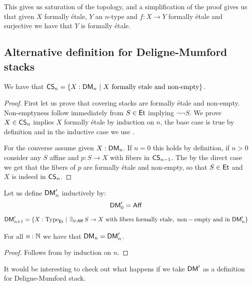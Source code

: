 \begin{remark}
This gives us saturation of the topology, and a simplification of the proof gives us that given $X$ formally \'etale, $Y$ an $n$-type and $f:X\to Y$ formally \'etale and surjective we have that $Y$ is formally \'etale.
\end{remark}


\subsection{Alternative definition for Deligne-Mumford stacks}

\begin{proposition}\label{covering-stacks-are-formally-etale}
We have that $\CS_n = \{X:\DM_n\ |\ X\ \text{formally\ etale\ and\ non-empty}\}$.
\end{proposition}

\begin{proof}
First let us prove that covering stacks are formally \'etale and non-empty. Non-emptyness follow immediately from $S\in\mathsf{Et}$ implying $\neg\neg S$. We prove $X\in\mathsf{CS}_n$ implies $X$ formally \'etale by induction on $n$, the base case is true by definition and in the inductive case we use .

For the converse assume given $X:\mathsf{DM}_n$. If $n=0$ this holds by definition, if $n>0$ consider any $S$ affine and $p:S\to X$ with fibers in $\mathsf{CS}_{n-1}$. The by the direct case we get that the fibers of $p$ are formally \'etale and non-empty, so that $S\in\mathsf{Et}$ and $X$ is indeed in $\mathsf{CS}_n$.
\end{proof}

\begin{definition}
Let us define $\mathsf{DM}'_n$ inductively by: 
\[\mathsf{DM}'_0 = \mathsf{Aff}\]
\[\DM'_{n+1} = \{X:\Type_\Et\ |\ \exists_{S:\Aff}\, S\to X\ \mathrm{with\ fibers\ formally\ etale,\ non-empty\ and\ in}\ \DM'_n\}\]
\end{definition}

\begin{proposition}
For all $n:\mathbb{N}$ we have that $\mathsf{DM}_n=\mathsf{DM}'_n$.
\end{proposition}

\begin{proof}
Follows from  by induction on $n$.
\end{proof}

\begin{remark}
It would be interesting to check out what happens if we take $\mathsf{DM}'$ as a definition for Deligne-Mumford stack.
\end{remark}


